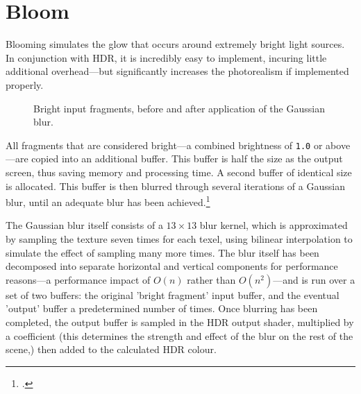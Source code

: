 \documentclass[11pt, oneside]{report}
\begin{document}
\section{Bloom}
Blooming simulates the glow that occurs around extremely bright light sources. In conjunction with \gls{HDR}, it is incredibly easy to implement, incuring little additional overhead---but significantly increases the photorealism if implemented properly.

\begin{figure}[!htbp]
  \centering
  \hfill
  \caption{Bright input fragments, before and after application of the Gaussian blur.}
\end{figure}

All fragments that are considered bright---a combined brightness of \texttt{1.0} or above---are copied into an additional buffer. This buffer is half the size as the output screen, thus saving memory and processing time. A second buffer of identical size is allocated. This buffer is then blurred through several iterations of a Gaussian blur, until an adequate blur has been achieved.\footcite{gpupro-hdr}

The Gaussian blur itself consists of a $13 \times 13$ blur kernel, which is approximated by sampling the texture seven times for each \gls{texel}, using bilinear interpolation to simulate the effect of sampling many more times. The blur itself has been decomposed into separate horizontal and vertical components for performance reasons---a performance impact of $O(n)$ rather than $O(n^2)$---and is run over a set of two buffers: the original 'bright fragment' input buffer, and the eventual 'output' buffer a predetermined number of times. Once blurring has been completed, the output buffer is sampled in the \gls{HDR} output shader, multiplied by a coefficient (this determines the strength and effect of the blur on the rest of the scene,) then added to the calculated \gls{HDR} colour.
\end{document}
